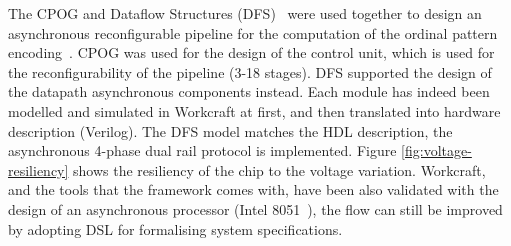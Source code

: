 \documentclass[conference]{IEEEtran}
\begin{document}
The CPOG and Dataflow Structures (DFS)~\cite{DFS} were used together to design an asynchronous
reconfigurable pipeline for the computation of the ordinal pattern encoding~\cite{OPE}. CPOG was used
for the design of the control unit, which is used for the reconfigurability of the pipeline
(3-18 stages). DFS supported the design of the datapath asynchronous components instead. Each
module has indeed been modelled and simulated in Workcraft at first, and then translated into
hardware description (Verilog). The DFS model matches the HDL description, the asynchronous
4-phase dual rail protocol is implemented. Figure \ref{fig:voltage-resiliency} shows the
resiliency of the chip to the voltage variation. Workcraft, and the tools that the framework
comes with, have been also validated with the design of an asynchronous processor (Intel
8051~\cite{rec-proc}), the flow can still be improved by adopting DSL for formalising system
specifications.

%
%

\end{document}
